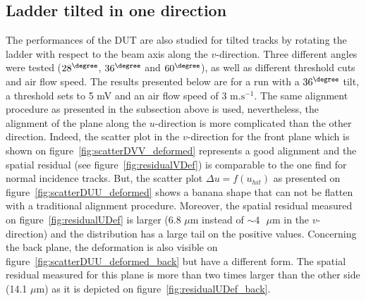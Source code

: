     \subsection{Ladder tilted in one direction}
    \label{subsec:deformation}

      The performances of the \gls{DUT} are also studied for tilted tracks by rotating the ladder with respect to the beam axis along the $v$-direction.
      Three different angles were tested ($28^{\degree}$, $36^{\degree}$ and $60^{\degree}$), as well as different threshold cuts and air flow speed. 
      The results presented below are for a run with a $36^{\degree}$ tilt, a threshold sets to 5 mV and an air flow speed of 3 $\text{m.s}^{-1}$.
      The same alignment procedure as presented in the subsection above is used, nevertheless, the alignment of the plane along the $u$-direction is more complicated than the other direction.
      Indeed, the scatter plot in the $v$-direction for the front plane which is shown on figure~\ref{fig:scatterDVV_deformed} represents a good alignment and the spatial residual (see figure~\ref{fig:residualVDef}) is comparable to the one find for normal incidence tracks.
      But, the scatter plot $\Delta u=f(u_{hit})$ as presented on figure~\ref{fig:scatterDUU_deformed} shows a banana shape that can not be flatten with a traditional alignment procedure.
      Moreover, the spatial residual measured on figure~\ref{fig:residualUDef} is larger (6.8 $\mu\text{m}$ instead of $\sim 4 \text{ }\mu\text{m}$ in the $v$-direction) and the distribution has a large tail on the positive values.
      Concerning the back plane, the deformation is also visible on figure~\ref{fig:scatterDUU_deformed_back} but have a different form.
      The spatial residual measured for this plane is more than two times larger than the other side (14.1 $\mu\text{m}$) as it is depicted on figure~\ref{fig:residualUDef_back}.

